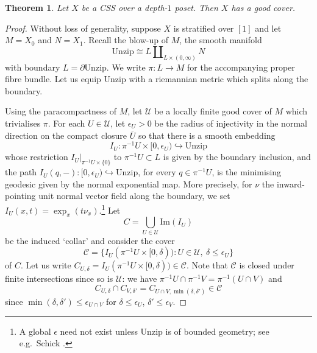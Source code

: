 \documentclass[11pt]{amsart}
\newcommand{\mcal}[1]{\mathcal{#1}}
\newcommand{\mrm}[1]{\mathrm{#1}}
\numberwithin{equation}{section}
\theoremstyle{definition}
\theoremstyle{remark}
\theoremstyle{plain}
\newtheorem{theorem}[equation]{Theorem}
\begin{document}

\begin{theorem}
    Let $X$ be a CSS {\color{MidnightBlue} over a depth-$1$ poset}. Then $X$ has a good cover.
\end{theorem}

\begin{proof}
    Without loss of generality, suppose $X$ is stratified over $[1]$ and let $M=X_0$ and $N=X_1$. Recall the blow-up of $M$, the smooth manifold
    \[
        \mrm{Unzip}\cong L\amalg_{L\times(0,\infty)}N
    \]
    with boundary $L=\partial\mrm{Unzip}$. We write $\pi\colon L\to M$ for the accompanying proper fibre bundle. Let us equip $\mrm{Unzip}$ with a riemannian metric which splits along the boundary.

    Using the paracompactness of $M$, let $\mcal{U}$ be a locally finite good cover of $M$ which trivialises $\pi$. For each $U\in\mcal{U}$, let $\epsilon_U>0$ be the radius of injectivity in the normal direction on the compact closure $\overline{U}$ so that there is a smooth embedding 
    \[
        I_U\colon \pi^{-1}U\times[0,\epsilon_U)\hookrightarrow \mrm{Unzip}
    \]
    whose restriction $I_U|_{\pi^{-1}U\times\{0\}}$ to $\pi^{-1}U\subset L$ is given by the boundary inclusion, and the path $I_U(q,-)\colon[0,\epsilon_U)\hookrightarrow \mrm{Unzip}$, for every $q\in\pi^{-1}U$, is the minimising geodesic given by the normal exponential map. More precisely, for $\nu$ the inward-pointing unit normal vector field along the boundary, we set $I_U(x,t)=\exp_x(t\nu_x)$.\footnote{A global $\epsilon$ need not exist unless $\mrm{Unzip}$ is of bounded geometry; see e.g.\ Schick \cite{schick2001bounded}.} Let 
    \[
        C=\bigcup_{U\in\mcal{U}}\mrm{Im}(I_U)
    \]
    be the induced `collar' and consider the cover
    \[  
        \mcal{C}=\{I_U(\pi^{-1}U\times[0,\delta)) : U\in\mcal{U},\ \delta\leq\epsilon_U\}
    \]
    of $C$. Let us write $C_{U,\delta}=I_U(\pi^{-1}U\times[0,\delta))\in\mcal{C}$. Note that $\mcal{C}$ is closed under finite intersections since so is $\mcal{U}$: we have $\pi^{-1}U\cap\pi^{-1}V=\pi^{-1}(U\cap V)$ and
    \[
        C_{U,\delta}\cap C_{V,\delta'}=C_{U\cap V,\min(\delta,\delta')}\in\mcal{C}
    \] 
    since $\min(\delta,\delta')\leq\epsilon_{U\cap V}$ for $\delta\leq\epsilon_U$, $\delta'\leq\epsilon_V$.
    

\end{proof}
\end{document}
